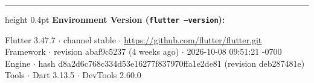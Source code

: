 \documentclass[10pt,a4paper]{article}
\begin{document}
\vspace{0.2cm}
\hrule height 0.4pt
\vspace{0.15cm}
\noindent
{\scriptsize \textbf{Environment Version (\texttt{flutter --version}):}}\\[1pt]
{\fontsize{6.2pt}{7.5pt}\selectfont\ttfamily
Flutter 3.47.7 $\cdot$ channel stable $\cdot$ \url{https://github.com/flutter/flutter.git}\\
Framework $\cdot$ revision abaf9c5237 (4 weeks ago) $\cdot$ 2026-10-08 09:51:21 -0700\\
Engine $\cdot$ hash d8a2d6c768c334d53e16277f837970ffa1e2de81 (revision deb287481e)\\
Tools $\cdot$ Dart 3.13.5 $\cdot$ DevTools 2.60.0\par
}
\end{document}
